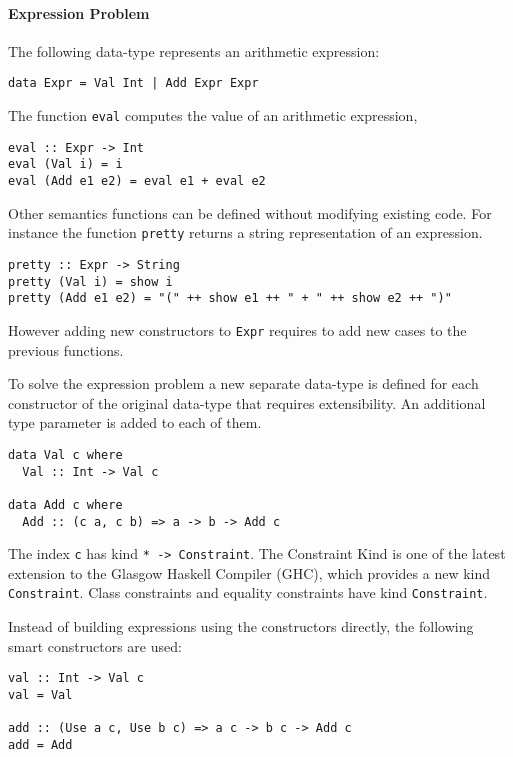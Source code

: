 \documentclass[../Thesis.tex]{subfiles}
\begin{document}
\paragraph{Expression Problem}
The following data-type represents an arithmetic expression:
\begin{verbatim}
data Expr = Val Int | Add Expr Expr
\end{verbatim}

The function \texttt{eval} computes the value of an arithmetic expression,
\begin{verbatim}
eval :: Expr -> Int
eval (Val i) = i
eval (Add e1 e2) = eval e1 + eval e2
\end{verbatim}

Other semantics functions can be defined without modifying existing code.
For instance the function \texttt{pretty} returns a string representation of an expression.

\begin{verbatim}
pretty :: Expr -> String
pretty (Val i) = show i
pretty (Add e1 e2) = "(" ++ show e1 ++ " + " ++ show e2 ++ ")"
\end{verbatim}

However adding new constructors to \texttt{Expr} requires to add new cases
to the previous functions.

To solve the expression problem a new separate data-type is defined for 
each constructor of the original data-type that requires extensibility.
An additional type parameter is added to each of them.

\begin{verbatim}
data Val c where
  Val :: Int -> Val c
  
data Add c where
  Add :: (c a, c b) => a -> b -> Add c
\end{verbatim}

The index \texttt{c} has kind \texttt{* -> Constraint}.
The Constraint Kind is one of the latest extension to the Glasgow Haskell Compiler (GHC), which provides a new kind \texttt{Constraint}.
Class constraints and equality constraints have kind \texttt{Constraint}.

Instead of building expressions using the constructors directly, the following smart constructors are used:

\begin{verbatim}
val :: Int -> Val c
val = Val

add :: (Use a c, Use b c) => a c -> b c -> Add c
add = Add 
\end{verbatim}
\end{document}
